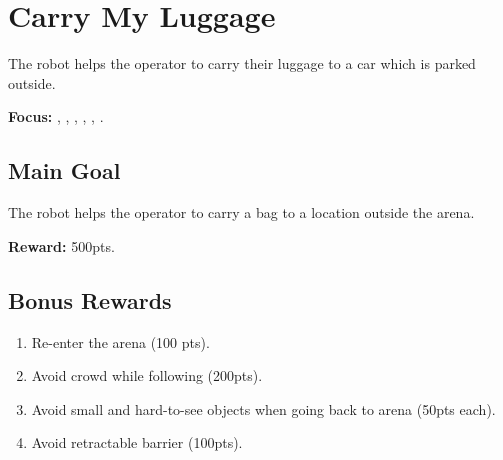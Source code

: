 \section{Carry My Luggage}
\label{test:carry-my-luggage}
The robot helps the operator to carry their luggage to a car which is parked outside.

\noindent \textbf{Focus:} \SysI{}, \HRI{}, \PerDet{}, \PerRec, \NAV{}, \MAP{}.

\subsection*{Main Goal}
The robot helps the operator to carry a bag to a location outside the arena.

\noindent\textbf{Reward:} 500pts.

\subsection*{Bonus Rewards}
\begin{enumerate}[nosep]
	\item Re-enter the arena (100 pts).
	\item Avoid crowd while following (200pts).
	\item Avoid small and hard-to-see objects when going back to arena (50pts each).
	\item Avoid retractable barrier (100pts).
\end{enumerate}


